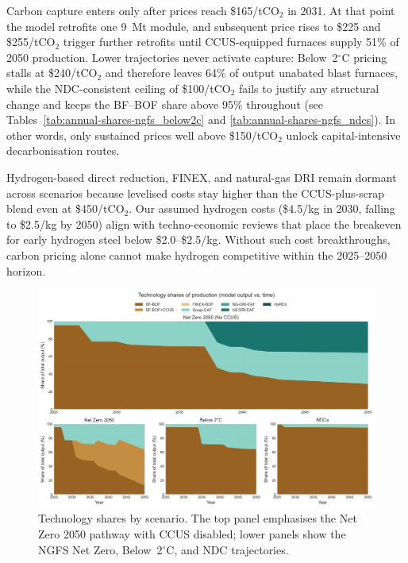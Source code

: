 \documentclass[preprint,1p,authoryear]{elsarticle}
\begin{document}
Carbon capture enters only after prices reach \$165/tCO$_2$ in 2031. At that point the model retrofits one 9~Mt module, and subsequent price rises to \$225 and \$255/tCO$_2$ trigger further retrofits until CCUS-equipped furnaces supply 51\% of 2050 production. Lower trajectories never activate capture: Below~2$^\circ$C pricing stalls at \$240/tCO$_2$ and therefore leaves 64\% of output unabated blast furnaces, while the NDC-consistent ceiling of \$100/tCO$_2$ fails to justify any structural change and keeps the BF--BOF share above 95\% throughout (see Tables~\ref{tab:annual-shares-ngfs_below2c} and \ref{tab:annual-shares-ngfs_ndcs}). In other words, only sustained prices well above \$150/tCO$_2$ unlock capital-intensive decarbonisation routes.

Hydrogen-based direct reduction, FINEX, and natural-gas DRI remain dormant across scenarios because levelised costs stay higher than the CCUS-plus-scrap blend even at \$450/tCO$_2$. Our assumed hydrogen costs (\$4.5/kg in 2030, falling to \$2.5/kg by 2050) align with techno-economic reviews \citep{MaterialEconomics2019,demailly2018european} that place the breakeven for early hydrogen steel below \$2.0--\$2.5/kg. Without such cost breakthroughs, carbon pricing alone cannot make hydrogen competitive within the 2025--2050 horizon.

\begin{figure}[!t]
  \centering
  \includegraphics[width=0.8\linewidth]{technology_transition}
  \caption{Technology shares by scenario. The top panel emphasises the Net Zero 2050 pathway with CCUS disabled; lower panels show the NGFS Net Zero, Below~2$^\circ$C, and NDC trajectories.}
  \label{fig:technology-transition}
\end{figure}
\end{document}
